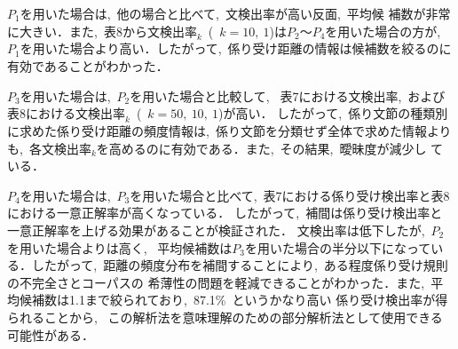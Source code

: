 $P_1$を用いた場合は,\ 他の場合と比べて,\ 文検出率が高い反面,\ 平均候
補数が非常に大きい．また,\ 表8から$文検出率_k$\ (\ $k=10,\ 1$)は$P_2$〜$P_4$を用いた場合の方が,\ $P_1$を用いた場合より高い．したがって,\ 係り受け距離の情報は候補数を絞るのに有効であることがわかった．

$P_3$を用いた場合は,\ $P_2$を用いた場合と比較して,
\ 表7における文検出率,\ および表8における$文検出率_k$\ (\ $k=50,\ 10,\ 1$)が高い．
したがって,\ 係り文節の種類別に求めた係り受け距離の頻度情報は,\ 係り文節を分類せず全体で求めた情報よりも,\ 
各文検出率$_k$を高めるのに有効である．また,\ その結果,\ 曖昧度が減少し
ている．

$P_4$を用いた場合は,\ $P_3$を用いた場合と比べて,\ 表7における係り受け検出率と表8における一意正解率が高くなっている．
したがって,\ 補間は係り受け検出率と一意正解率を上げる効果があることが検証された．
文検出率は低下したが,\ $P_2$を用いた場合よりは高く,
\ 平均候補数は$P_3$を用いた場合の半分以下になっている．したがって,\ 
距離の頻度分布を補間することにより,\ ある程度係り受け規則の不完全さとコーパスの
希薄性の問題を軽減できることがわかった．また,\ 平均候補数は1.1まで絞られており,\ 87.1\%\ というかなり高い
係り受け検出率が得られることから,
\ この解析法を意味理解のための部分解析法として使用できる可能性がある．

